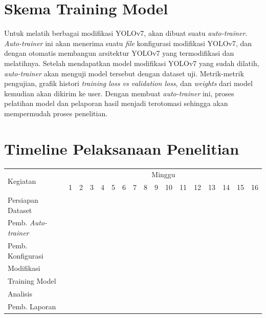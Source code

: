 \section{Skema Training Model}
  Untuk melatih berbagai modifikasi YOLOv7, akan dibuat suatu \emph{auto-trainer}.
  \emph{Auto-trainer} ini akan menerima suatu \emph{file} konfigurasi modifikasi YOLOv7, dan dengan otomatis membangun arsitektur YOLOv7 yang termodifikasi dan melatihnya.
  Setelah mendapatkan model modifikasi YOLOv7 yang sudah dilatih, \emph{auto-trainer} akan menguji model tersebut dengan dataset uji.
  Metrik-metrik pengujian, grafik histori \emph{training loss vs validation loss}, dan \emph{weights} dari model kemudian akan dikirim ke user.
  Dengan membuat \emph{auto-trainer} ini, proses pelatihan model dan pelaporan hasil menjadi terotomasi sehingga akan mempermudah proses penelitian.

\section{Timeline Pelaksanaan Penelitian}
  \newcommand{\w}{}
  \newcommand{\G}{\cellcolor{gray}}
  \begin{table}[h!]
    \label{tbl:timeline}
    \begin{tabular}{|p{3.5cm}|c|c|c|c|c|c|c|c|c|c|c|c|c|c|c|c|}
  
      \hline
      \multirow{2}{*}{Kegiatan} & \multicolumn{16}{|c|}{Minggu} \\
      \cline{2-17} &
      1 & 2 & 3 & 4 & 5 & 6 & 7 & 8 & 9 & 10 & 11 & 12 & 13 & 14 & 15 & 16 \\
      \hline
  
      Persiapan Dataset &
      \G & \w & \w & \w & \w & \w & \w & \w & \w & \w & \w & \w & \w & \w & \w & \w \\
      \hline
  
      Pemb. \emph{Auto-trainer} &
      \w & \G & \w & \w & \w & \w & \w & \w & \w & \w & \w & \w & \w & \w & \w & \w \\
      \hline
  
      Pemb. Konfigurasi&
      \w & \w & \G & \G & \G & \G & \G & \G & \G & \G & \G & \G & \w & \w & \w & \w \\
      Modifikasi &
      \w & \w & \G & \G & \G & \G & \G & \G & \G & \G & \G & \G & \w & \w & \w & \w \\
      \hline
  
      Training Model &
      \w & \w & \G & \G & \G & \G & \G & \G & \G & \G & \G & \G & \w & \w & \w & \w \\
      \hline

      Analisis &
      \w & \w & \G & \G & \G & \G & \G & \G & \G & \G & \G & \G & \G & \w & \w & \w \\
      \hline

      Pemb. Laporan &
      \w & \w & \w & \w & \w & \w & \w & \w & \w & \w & \w & \w & \G & \G & \G & \G \\
      \hline
  
    \end{tabular}
  \end{table}
